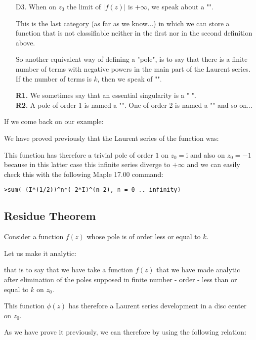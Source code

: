 \begin{enumerate}
		\item[D3.] When on $z_0$ the limit of $\vert f(z) \vert$ is $+\infty$, we speak about a "\label{pole}".
		
		This is the last category (as far as we know...) in which we can store a function that is not classifiable neither in the first nor in the second definition above.
		
		So another equivalent way of defining a "pole", is to say that there is a finite number of terms with negative powers in the main part of the Laurent series. If the number of terms is $k$, then we speak of "".
		
	\begin{tcolorbox}[title=Remarks,colframe=black,arc=10pt]
	\textbf{R1.} We sometimes say that an essential singularity is a " ".\\
	
	\textbf{R2.} A pole of order 1 is named a "". One of order 2 is named a "" and so on...
	\end{tcolorbox}
	\end{enumerate}
	If we come back on our example:
	
	We have proved previously that the Laurent series of the function was:
	
	This function has therefore a trivial pole of order $1$ on $z_0=\mathrm{i}$ and also on $z_0=-1$ because in this latter case this infinite series diverge to $+\infty$ and we can easily check this with the following Maple 17.00 command:
	
	\texttt{>sum(-(I*(1/2))\string^n*(-2*I)\string^(n-2), n = 0 .. infinity)}
	
	\subsection{Residue Theorem}\label{residue theorem}
	Consider a function $f(z)$ whose pole is of order less or equal to $k$.
	
	Let us make it  analytic:
	
	that is to say that we have take a function $f(z)$ that we have made analytic after elimination of the poles supposed in finite number - order - less than or equal to $k$ on $z_0$. 
	
	This function $\phi(z)$ has therefore a Laurent series development  in a disc center on $z_0$.
	
	As we have prove it previously, we can therefore by using the following relation:
	
